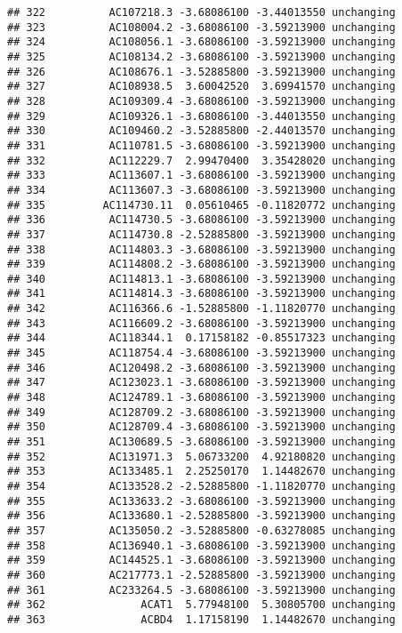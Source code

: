 \documentclass[]{article}
\begin{document}
\begin{verbatim}
## 322          AC107218.3 -3.68086100 -3.44013550 unchanging
## 323          AC108004.2 -3.68086100 -3.59213900 unchanging
## 324          AC108056.1 -3.68086100 -3.59213900 unchanging
## 325          AC108134.2 -3.68086100 -3.59213900 unchanging
## 326          AC108676.1 -3.52885800 -3.59213900 unchanging
## 327          AC108938.5  3.60042520  3.69941570 unchanging
## 328          AC109309.4 -3.68086100 -3.59213900 unchanging
## 329          AC109326.1 -3.68086100 -3.44013550 unchanging
## 330          AC109460.2 -3.52885800 -2.44013570 unchanging
## 331          AC110781.5 -3.68086100 -3.59213900 unchanging
## 332          AC112229.7  2.99470400  3.35428020 unchanging
## 333          AC113607.1 -3.68086100 -3.59213900 unchanging
## 334          AC113607.3 -3.68086100 -3.59213900 unchanging
## 335         AC114730.11  0.05610465 -0.11820772 unchanging
## 336          AC114730.5 -3.68086100 -3.59213900 unchanging
## 337          AC114730.8 -2.52885800 -3.59213900 unchanging
## 338          AC114803.3 -3.68086100 -3.59213900 unchanging
## 339          AC114808.2 -3.68086100 -3.59213900 unchanging
## 340          AC114813.1 -3.68086100 -3.59213900 unchanging
## 341          AC114814.3 -3.68086100 -3.59213900 unchanging
## 342          AC116366.6 -1.52885800 -1.11820770 unchanging
## 343          AC116609.2 -3.68086100 -3.59213900 unchanging
## 344          AC118344.1  0.17158182 -0.85517323 unchanging
## 345          AC118754.4 -3.68086100 -3.59213900 unchanging
## 346          AC120498.2 -3.68086100 -3.59213900 unchanging
## 347          AC123023.1 -3.68086100 -3.59213900 unchanging
## 348          AC124789.1 -3.68086100 -3.59213900 unchanging
## 349          AC128709.2 -3.68086100 -3.59213900 unchanging
## 350          AC128709.4 -3.68086100 -3.59213900 unchanging
## 351          AC130689.5 -3.68086100 -3.59213900 unchanging
## 352          AC131971.3  5.06733200  4.92180820 unchanging
## 353          AC133485.1  2.25250170  1.14482670 unchanging
## 354          AC133528.2 -2.52885800 -1.11820770 unchanging
## 355          AC133633.2 -3.68086100 -3.59213900 unchanging
## 356          AC133680.1 -2.52885800 -3.59213900 unchanging
## 357          AC135050.2 -3.52885800 -0.63278085 unchanging
## 358          AC136940.1 -3.68086100 -3.59213900 unchanging
## 359          AC144525.1 -3.68086100 -3.59213900 unchanging
## 360          AC217773.1 -2.52885800 -3.59213900 unchanging
## 361          AC233264.5 -3.68086100 -3.59213900 unchanging
## 362               ACAT1  5.77948100  5.30805700 unchanging
## 363               ACBD4  1.17158190  1.14482670 unchanging

\end{verbatim}
\end{document}
